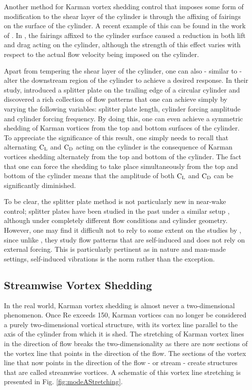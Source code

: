 \documentclass[oneside]{utmthesis}
\begin{document}
Another method for Karman vortex shedding control that imposes some form of modification to the shear layer of the cylinder is through the affixing of fairings on the surface of the cylinder. A recent example of this can be found in the work of \citet{Kang2020}. In \citet{Kang2020}, the fairings affixed to the cylinder surface caused a reduction in both lift and drag acting on the cylinder, although the strength of this effect varies with respect to the actual flow velocity being imposed on the cylinder.

Apart from tempering the shear layer of the cylinder, one can also - similar to \citet{Yokoi2016} - alter the downstream region of the cylinder to achieve a desired response. In their study, \citet{Yokoi2016} introduced a splitter plate on the trailing edge of a circular cylinder and discovered a rich collection of flow patterns that one can achieve simply by varying the following variables: splitter plate length, cylinder forcing amplitude and cylinder forcing frequency. By doing this, one can even achieve a symmetric shedding of Karman vortices from the top and bottom surfaces of the cylinder. To appreciate the significance of this result, one simply needs to recall that alternating $\text{C}_{\text{L}}$ and $\text{C}_{\text{D}}$ acting on the cylinder is the consequence of Karman vortices shedding alternately from the top and bottom of the cylinder. The fact that one can force the shedding to take place simultaneously from the top and bottom of the cylinder means that the amplitude of both $\text{C}_{\text{L}}$ and $\text{C}_{\text{D}}$ can be significantly diminished.

To be clear, the splitter plate method is not particularly new in near-wake control; splitter plates have been studied in the past under a similar setup \citep{MatAli2012}, although under completely different flow conditions and cylinder geometry. However, one may find it difficult not to rely to some extent on the studies by \citet{MatAli2012}, since unlike \citet{Yokoi2016}, they study flow patterns that are self-induced and does not rely on external forcing. This is particularly pertinent as in nature and man-made settings, self-induced vibrations is the norm rather than the exception.

\subsection{Streamwise Vortex Shedding} \label{ssec:svShedding}

In the real world, Karman vortex shedding is almost never a two-dimensional phenomenon. Once Re exceeds 150, Karman vortices can no longer be considered a purely two-dimensional vortical structure, with its vortex line parallel to the axis of the cylinder from which it is shed. The stretching of Karman vortex lines in the direction of flow breaks the two-dimensionality as there are now sections of the vortex line that points in the direction of the flow. The sections of the vortex line that now points in the direction of the flow - or stream - create structures that are called streamwise vortices. A schematic of this vortex line stretching is presented in Fig. \ref{fig:modeAStretching}.
\end{document}
